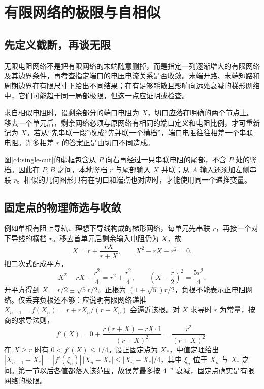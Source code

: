 \section{有限网络的极限与自相似}
\subsection{先定义截断，再谈无限}

无限电阻网络不是把有限网络的末端随意删掉，而是指定一列逐渐增大的有限网络及其边界条件，再考查指定端口的电压电流关系是否收敛。末端开路、末端短路和周期边界在有限尺寸下给出不同结果；在有足够耗散且影响向远处衰减的梯形网络中，它们可能趋于同一局部极限，但这一点应证明或检查。

求自相似电阻时，设剩余部分的端口电阻为 $X$，切口应落在明确的两个节点上。移去一个单元后，剩余网络必须与原网络有相同的端口定义和电阻比例，才可重新记为 $X$。若从“先串联一段”改成“先并联一个横档”，端口电阻往往相差一个串联电阻。许多相差 $r$ 的答案正是由切口不同造成。

图\ref{c4:single-cut}的虚框包含从 $P$ 向右再经过一只串联电阻的尾部，不含 $P$ 处的竖档。因此在 $P,B$ 之间，本地竖档 $r$ 与尾部输入 $X$ 并联；从 $A$ 输入还须加左侧串联 $r$。相似的几何图形只有在切口和端点也对应时，才能使用同一个递推变量。

\subsection{固定点的物理筛选与收敛}

例如单根有阻上导轨、理想下导线构成的梯形网络，每单元先串联 $r$，再接一个对下导线的横档 $r$。移去首单元后剩余输入电阻仍为 $X$，故
\[
 X=r+\frac{rX}{r+X},\qquad X^2-rX-r^2=0.
\]
把二次式配成平方，
\[
 X^2-rX+\frac{r^2}{4}=r^2+\frac{r^2}{4},\qquad
 \left(X-\frac r2\right)^2=\frac{5r^2}{4}.
\]
开平方得到 $X=r/2\pm\sqrt5r/2$。正根为 $(1+\sqrt5)r/2$，负根不能表示正电阻网络。仅丢弃负根还不够：应说明有限网络递推 $X_{n+1}=f(X_n)=r+rX_n/(r+X_n)$ 会逼近该根。对 $X$ 求导时 $r$ 为常量，按商的求导法则，
\[
 f'(X)=0+\frac{r(r+X)-rX\cdot1}{(r+X)^2}
 =\frac{r^2}{(r+X)^2}.
\]
在 $X\ge r$ 时有 $0<f'(X)\le1/4$。设正固定点为 $X_*$，中值定理给出
$|X_{n+1}-X_*|=|f'(\xi_n)|\,|X_n-X_*|\le|X_n-X_*|/4$，其中 $\xi_n$ 位于 $X_n$ 与 $X_*$ 之间。第一节以后各值都落入该范围，故误差最多按 $4^{-n}$ 衰减，固定点确实是有限网络的极限。

